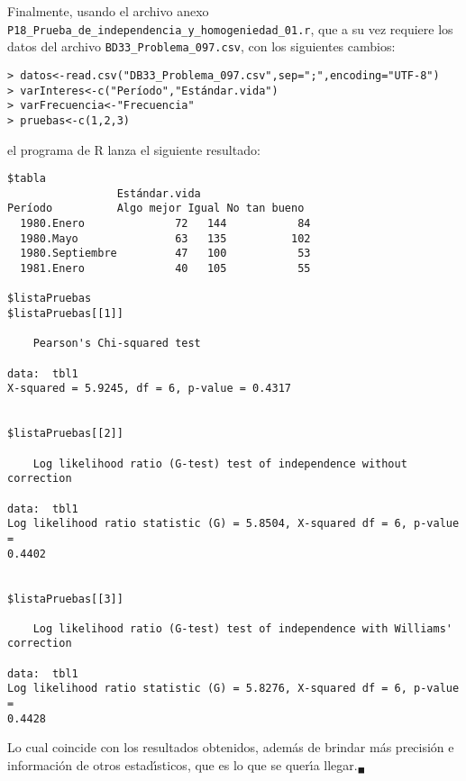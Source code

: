 \begin{solucion}
 Finalmente, usando el archivo anexo
 \texttt{P18\_Prueba\_de\_independencia\_y\_homogeniedad\_01.r},
 que a su vez requiere los datos del archivo
 \texttt{BD33\_Problema\_097.csv}, con los siguientes cambios:
 \begin{verbatim}
> datos<-read.csv("DB33_Problema_097.csv",sep=";",encoding="UTF-8")
> varInteres<-c("Período","Estándar.vida")
> varFrecuencia<-"Frecuencia"
> pruebas<-c(1,2,3)
 \end{verbatim}
 \vspace{-0.5cm}
 el programa de R lanza el siguiente resultado:
 \begin{verbatim}
$tabla
                 Estándar.vida
Período          Algo mejor Igual No tan bueno
  1980.Enero              72   144           84
  1980.Mayo               63   135          102
  1980.Septiembre         47   100           53
  1981.Enero              40   105           55

$listaPruebas
$listaPruebas[[1]]

	Pearson's Chi-squared test

data:  tbl1
X-squared = 5.9245, df = 6, p-value = 0.4317


$listaPruebas[[2]]

	Log likelihood ratio (G-test) test of independence without correction

data:  tbl1
Log likelihood ratio statistic (G) = 5.8504, X-squared df = 6, p-value =
0.4402


$listaPruebas[[3]]

	Log likelihood ratio (G-test) test of independence with Williams' correction

data:  tbl1
Log likelihood ratio statistic (G) = 5.8276, X-squared df = 6, p-value =
0.4428
 \end{verbatim}
 \vspace{-0.5cm}
 Lo cual coincide con los resultados obtenidos, adem\'as de brindar m\'as
 precisi\'on e informaci\'on de otros estad\'{\i}sticos,
 que es lo que se quer\'{\i}a llegar.${}_{\blacksquare}$
\end{solucion}

